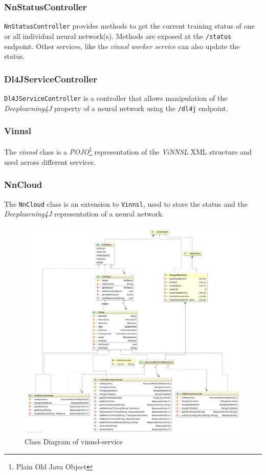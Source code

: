 \subsubsection{NnStatusController}\label{nnstatuscontroller}

\texttt{NnStatusController} provides methods to get the current training
status of one or all individual neural network(s). Methods are exposed
at the \texttt{/status} endpoint. Other services, like the \emph{vinnsl
worker service} can also update the status.

\subsubsection{Dl4JServiceController}\label{dl4jservicecontroller}

\texttt{Dl4JServiceController} is a controller that allows manipulation
of the \emph{Deeplearning4J} property of a neural network using the
\texttt{/dl4j} endpoint.

\subsubsection{Vinnsl}\label{vinnsl-1}

The \emph{vinnsl} class is a \emph{POJO}\footnote{Plain Old Java Object}
representation of the \emph{ViNNSL} XML structure and used across
different services.

\subsubsection{NnCloud}\label{nncloud}

The \texttt{NnCloud} class is an extension to \texttt{Vinnsl}, used to
store the status and the \emph{Deeplearning4J} representation of a
neural network.

\begin{figure}
\centering
\includegraphics[width=17.00000cm]{images/uml-class-diagram-vinnsl-service}
\caption{Class Diagram of vinnsl-service \label{class_vinnsl-service}}
\end{figure}

